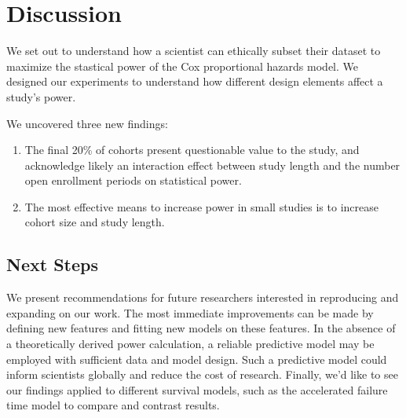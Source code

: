 \section{Discussion}

We set out to understand how a scientist can ethically subset their dataset to maximize the stastical power of the Cox proportional hazards model. We designed our experiments to understand how different design elements affect a study's power. 

We uncovered three new findings:

\begin{enumerate}
    \item The final 20\% of cohorts present questionable value to the study, and acknowledge likely an interaction effect between study length and the number open enrollment periods on statistical power. 
    \item The most effective means to increase power in small studies is to increase cohort size and study length. 
\end{enumerate}

\subsection{Next Steps}

We present recommendations for future researchers interested in reproducing and expanding on our work. The most immediate improvements can be made by defining new features and fitting new models on these features. In the absence of a theoretically derived power calculation, a reliable predictive model may be employed with sufficient data and model design. Such a predictive model could inform scientists globally and reduce the cost of research. Finally, we'd like to see our findings applied to different survival models, such as the accelerated failure time model to compare and contrast results. 
